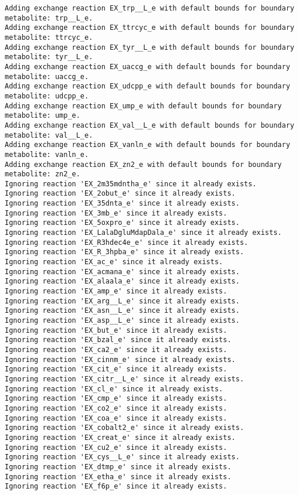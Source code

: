 \documentclass[
  letterpaper,
  DIV=11,
  numbers=noendperiod]{scrartcl}
\begin{document}
\begin{verbatim}
Adding exchange reaction EX_trp__L_e with default bounds for boundary metabolite: trp__L_e.
Adding exchange reaction EX_ttrcyc_e with default bounds for boundary metabolite: ttrcyc_e.
Adding exchange reaction EX_tyr__L_e with default bounds for boundary metabolite: tyr__L_e.
Adding exchange reaction EX_uaccg_e with default bounds for boundary metabolite: uaccg_e.
Adding exchange reaction EX_udcpp_e with default bounds for boundary metabolite: udcpp_e.
Adding exchange reaction EX_ump_e with default bounds for boundary metabolite: ump_e.
Adding exchange reaction EX_val__L_e with default bounds for boundary metabolite: val__L_e.
Adding exchange reaction EX_vanln_e with default bounds for boundary metabolite: vanln_e.
Adding exchange reaction EX_zn2_e with default bounds for boundary metabolite: zn2_e.
Ignoring reaction 'EX_2m35mdntha_e' since it already exists.
Ignoring reaction 'EX_2obut_e' since it already exists.
Ignoring reaction 'EX_35dnta_e' since it already exists.
Ignoring reaction 'EX_3mb_e' since it already exists.
Ignoring reaction 'EX_5oxpro_e' since it already exists.
Ignoring reaction 'EX_LalaDgluMdapDala_e' since it already exists.
Ignoring reaction 'EX_R3hdec4e_e' since it already exists.
Ignoring reaction 'EX_R_3hpba_e' since it already exists.
Ignoring reaction 'EX_ac_e' since it already exists.
Ignoring reaction 'EX_acmana_e' since it already exists.
Ignoring reaction 'EX_alaala_e' since it already exists.
Ignoring reaction 'EX_amp_e' since it already exists.
Ignoring reaction 'EX_arg__L_e' since it already exists.
Ignoring reaction 'EX_asn__L_e' since it already exists.
Ignoring reaction 'EX_asp__L_e' since it already exists.
Ignoring reaction 'EX_but_e' since it already exists.
Ignoring reaction 'EX_bzal_e' since it already exists.
Ignoring reaction 'EX_ca2_e' since it already exists.
Ignoring reaction 'EX_cinnm_e' since it already exists.
Ignoring reaction 'EX_cit_e' since it already exists.
Ignoring reaction 'EX_citr__L_e' since it already exists.
Ignoring reaction 'EX_cl_e' since it already exists.
Ignoring reaction 'EX_cmp_e' since it already exists.
Ignoring reaction 'EX_co2_e' since it already exists.
Ignoring reaction 'EX_coa_e' since it already exists.
Ignoring reaction 'EX_cobalt2_e' since it already exists.
Ignoring reaction 'EX_creat_e' since it already exists.
Ignoring reaction 'EX_cu2_e' since it already exists.
Ignoring reaction 'EX_cys__L_e' since it already exists.
Ignoring reaction 'EX_dtmp_e' since it already exists.
Ignoring reaction 'EX_etha_e' since it already exists.
Ignoring reaction 'EX_f6p_e' since it already exists.

\end{verbatim}
\end{document}
